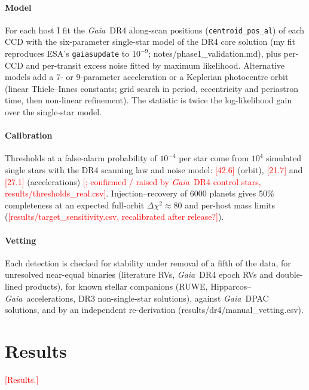 \documentclass{aastex701}
\newcommand{\XX}[1]{\textcolor{red}{[#1]}}
\newcommand{\gaia}{\textit{Gaia}}
\begin{document}
\paragraph{Model}
For each host I fit the \gaia\ DR4 along-scan positions (\texttt{centroid\_pos\_al}) of each CCD
with the six-parameter single-star model of the DR4 core solution (my fit reproduces ESA's
\texttt{gaiasupdate} to $10^{-9}$; notes/phase1\_validation.md), plus per-CCD and per-transit
excess noise fitted by maximum likelihood. Alternative models add a 7- or 9-parameter
acceleration or a Keplerian photocentre orbit (linear Thiele--Innes constants; grid search in
period, eccentricity and periastron time, then non-linear refinement). The statistic is twice
the log-likelihood gain over the single-star model.

\paragraph{Calibration}
Thresholds at a false-alarm probability of $10^{-4}$ per star come from $10^4$ simulated
single stars with the DR4 scanning law and noise model: \XX{42.6} (orbit), \XX{21.7} and
\XX{27.1} (accelerations) %
\XX{; confirmed / raised by \gaia\ DR4 control stars, results/thresholds\_real.csv}.
Injection--recovery of 6000 planets gives 50\% completeness at an expected full-orbit
$\Delta\chi^2 \approx 80$ %
and per-host mass limits (\XX{results/target\_sensitivity.csv, recalibrated after release?}).

\paragraph{Vetting}
Each detection is checked for stability under removal of a fifth of the data, for unresolved
near-equal binaries (literature RVs, \gaia\ DR4 epoch RVs and double-lined products), for
known stellar companions (RUWE, Hipparcos--\gaia\ accelerations, DR3 non-single-star
solutions), against \gaia\ DPAC solutions, and by an independent re-derivation
(results/dr4/manual\_vetting.csv).

\section{Results} \label{sec:results}
\XX{Results.}
\end{document}
